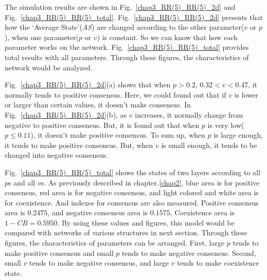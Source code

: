 The simulation results are shown in Fig.~\ref{chap3_RR(5)_RR(5)_2d} and Fig.~\ref{chap3_RR(5)_RR(5)_total}.  Fig.~\ref{chap3_RR(5)_RR(5)_2d} presents that how the `Average State'(\textit{AS}) are changed according to the other parameter($v$ or $p$), when one parameter($p$ or $v$) is constant. So we can know that how each parameter works on the network. Fig.~\ref{chap3_RR(5)_RR(5)_total} provides total results with all parameters. Through these figures, the characteristics of network would be analyzed.

Fig.~\ref{chap3_RR(5)_RR(5)_2d}(a) shows that when $p > 0.2$, $0.32 < v < 0.47$, it normally tends to positive consensus. Here, we could found out that if $v$ is lower or larger than certain values, it doesn't make consensus. In Fig.~\ref{chap3_RR(5)_RR(5)_2d}(b), as $v$ increases, it normally change from negative to positive consensus. But, it is found out that when $p$ is very low($p \le 0.11$), it doesn't make positive consensus.  To sum up, when $p$ is large enough, it tends to make positive consensus. But, when $v$ is small enough, it tends to be changed into negative consensus.

Fig.~\ref{chap3_RR(5)_RR(5)_total} shows the states of two layers according to all $p$s and all $v$s. As previously described in chapter.\ref{chap2}, blue area is for positive consensus, red area is for negative consensus, and light colored and white area is for coexistence. And indexes for consensus are also measured. Positive consensus area is $0.2475$, and negative consensus area is $0.1575$. Coexistence area is $1 - CR = 0.5950$. By using these values and figures, this model would be compared with networks of various structures in next section. Through these figures, the characteristics of parameters can be arranged. First, large $p$ tends to make positive consensus and small $p$ tends to make negative consensus. Second, small $v$ tends to make negative consensus, and large $v$ tends to make coexistence state. 

